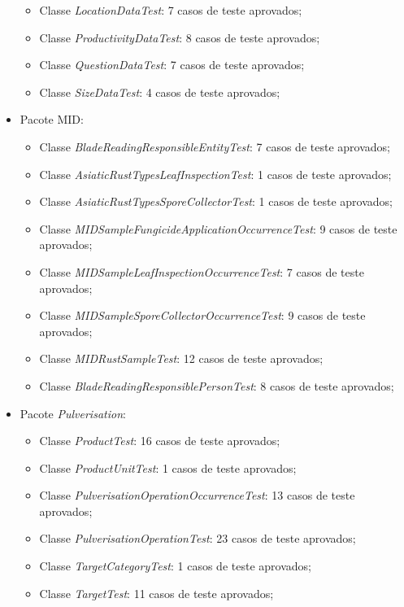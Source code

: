 \begin{itemize}
\begin{itemize}
    \item Classe \textit{LocationDataTest}: 7 casos de teste aprovados;
    \item Classe \textit{ProductivityDataTest}: 8 casos de teste aprovados;
    \item Classe \textit{QuestionDataTest}: 7 casos de teste aprovados;
    \item Classe \textit{SizeDataTest}: 4 casos de teste aprovados;
\end{itemize}
  \item Pacote MID:
  \begin{itemize}
    \item Classe \textit{BladeReadingResponsibleEntityTest}: 7 casos de teste aprovados;
    \item Classe \textit{AsiaticRustTypesLeafInspectionTest}: 1 casos de teste aprovados;
    \item Classe \textit{AsiaticRustTypesSporeCollectorTest}: 1 casos de teste aprovados;
    \item Classe \textit{MIDSampleFungicideApplicationOccurrenceTest}: 9 casos de teste aprovados;
    \item Classe \textit{MIDSampleLeafInspectionOccurrenceTest}: 7 casos de teste aprovados;
    \item Classe \textit{MIDSampleSporeCollectorOccurrenceTest}: 9 casos de teste aprovados;
    \item Classe \textit{MIDRustSampleTest}: 12 casos de teste aprovados;
    \item Classe \textit{BladeReadingResponsiblePersonTest}: 8 casos de teste aprovados;
    \end{itemize}
    \item Pacote \textit{Pulverisation}:
  \begin{itemize}
    \item Classe \textit{ProductTest}: 16 casos de teste aprovados;
    \item Classe \textit{ProductUnitTest}: 1 casos de teste aprovados;
    \item Classe \textit{PulverisationOperationOccurrenceTest}: 13 casos de teste aprovados;
    \item Classe \textit{PulverisationOperationTest}: 23 casos de teste aprovados;
    \item Classe \textit{TargetCategoryTest}: 1 casos de teste aprovados;
    \item Classe \textit{TargetTest}: 11 casos de teste aprovados;
    \end{itemize}
    \end{itemize}




